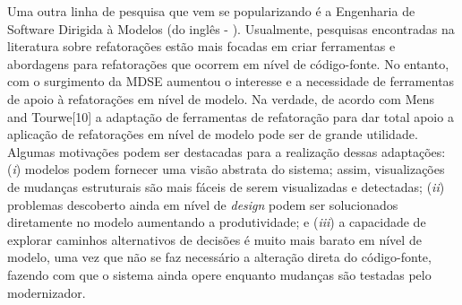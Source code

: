 Uma outra linha de pesquisa que vem se popularizando é a Engenharia de Software Dirigida à Modelos (do inglês - ). Usualmente, pesquisas encontradas na literatura sobre refatorações estão mais focadas em criar ferramentas e abordagens para refatorações que ocorrem em nível de código-fonte. No entanto, com o surgimento da MDSE aumentou o interesse e a necessidade de ferramentas de apoio à refatorações em nível de modelo. Na verdade, de acordo com Mens and Tourwe[10] a adaptação de ferramentas de refatoração para dar total apoio a aplicação de refatorações em nível de modelo pode ser de grande utilidade. Algumas motivações podem ser destacadas para a realização dessas adaptações: (\emph{i}) modelos podem fornecer uma visão abstrata do sistema; assim, visualizações de mudanças estruturais são mais fáceis de serem visualizadas e detectadas; (\emph{ii}) problemas descoberto ainda em nível de \emph{design} podem ser solucionados diretamente no modelo aumentando a produtividade; e (\emph{iii}) a capacidade de explorar caminhos alternativos de decisões é muito mais barato em nível de modelo, uma vez que não se faz necessário a alteração direta do código-fonte, fazendo com que o sistema ainda opere enquanto mudanças são testadas pelo modernizador.


